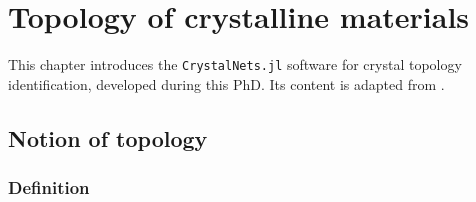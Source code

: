 \documentclass[main.tex]{subfiles}
\begin{document}
	
\chapter{Topology of crystalline materials}\label{topology}
\clearpage




%
%
%
%
%
%
%
%
%

%
%
%
%

This chapter introduces the \texttt{CrystalNets.jl} software for crystal topology identification, developed during this PhD. Its content is adapted from \cite{CrystalNets}.

\section{Notion of topology}


\subsection{Definition}
\end{document}
